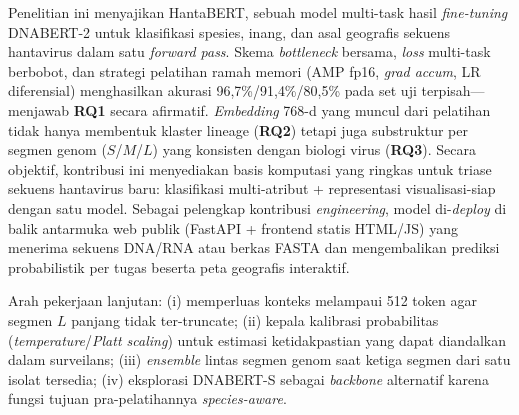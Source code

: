 \documentclass[conference]{IEEEtran}
\begin{document}
Penelitian ini menyajikan HantaBERT, sebuah model multi-task hasil
\emph{fine-tuning} DNABERT-2 untuk klasifikasi spesies, inang, dan asal
geografis sekuens hantavirus dalam satu \emph{forward pass}. Skema
\emph{bottleneck} bersama, \emph{loss} multi-task berbobot, dan
strategi pelatihan ramah memori (AMP fp16, \emph{grad accum}, LR
diferensial) menghasilkan akurasi 96{,}7\%/91{,}4\%/80{,}5\% pada set uji
terpisah---menjawab \textbf{RQ1} secara afirmatif. \emph{Embedding}
768-d yang muncul dari pelatihan tidak hanya membentuk klaster lineage
(\textbf{RQ2}) tetapi juga substruktur per segmen genom ($S$/$M$/$L$)
yang konsisten dengan biologi virus (\textbf{RQ3}). Secara objektif,
kontribusi ini menyediakan basis komputasi yang ringkas untuk triase
sekuens hantavirus baru: klasifikasi multi-atribut + representasi
visualisasi-siap dengan satu model. Sebagai pelengkap kontribusi
\emph{engineering}, model di-\emph{deploy} di balik antarmuka web
publik (FastAPI + frontend statis HTML/JS) yang menerima sekuens
DNA/RNA atau berkas FASTA dan mengembalikan prediksi probabilistik per tugas
beserta peta geografis interaktif.

Arah pekerjaan lanjutan: (i) memperluas konteks melampaui 512 token
agar segmen $L$ panjang tidak ter-truncate; (ii) kepala kalibrasi
probabilitas (\emph{temperature}/\emph{Platt scaling}) untuk estimasi
ketidakpastian yang dapat diandalkan dalam surveilans; (iii)
\emph{ensemble} lintas segmen genom saat ketiga segmen dari satu isolat
tersedia; (iv) eksplorasi DNABERT-S sebagai \emph{backbone} alternatif
karena fungsi tujuan pra-pelatihannya \emph{species-aware}.
\end{document}

